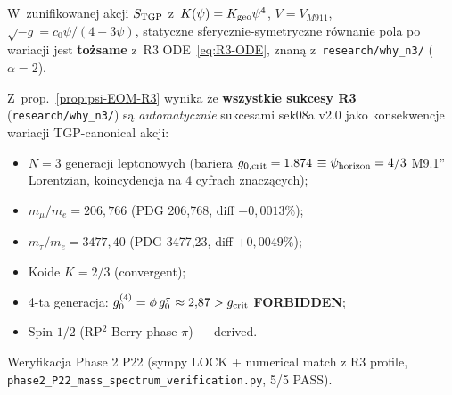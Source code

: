 \begin{proposition}%
\label{prop:psi-EOM-R3}
W~zunifikowanej akcji $S_{\rm TGP}$ z~$K(\psi) = K_{\rm geo}\psi^4$,
$V = V_{M911}$, $\sqrt{-g} = c_0\psi/(4-3\psi)$, statyczne sferycznie-symetryczne
r\'ownanie pola po wariacji jest \textbf{to\.zsame} z~R3 ODE~\eqref{eq:R3-ODE},
znan\k{a} z~\texttt{research/why\_n3/} ($\alpha = 2$).
\end{proposition}

\begin{remark}%
\label{rem:psi-EOM-R3-consequences}
Z~prop.~\ref{prop:psi-EOM-R3} wynika \.ze \textbf{wszystkie sukcesy R3}
(\texttt{research/why\_n3/}) s\k{a} \emph{automatycznie} sukcesami
sek08a v2.0 jako konsekwencje wariacji TGP-canonical akcji:
\begin{itemize}[nosep]
  \item $N = 3$ generacji leptonowych (bariera $g_{0,\rm crit} = 1{,}874$
    $\equiv \psi_{\rm horizon} = 4/3$ M9.1'' Lorentzian, koincydencja na
    4 cyfrach znacz\k{a}cych);
  \item $m_\mu/m_e = 206{,}766$ (PDG 206{,}768, diff $-0{,}0013\%$);
  \item $m_\tau/m_e = 3477{,}40$ (PDG 3477{,}23, diff $+0{,}0049\%$);
  \item Koide $K = 2/3$ (convergent);
  \item 4-ta generacja: $g_0^{(4)} = \phi\,g_0^\tau \approx 2{,}87 > g_{\rm crit}$
    \textbf{FORBIDDEN};
  \item Spin-$1/2$ (RP$^2$ Berry phase $\pi$) --- derived.
\end{itemize}
Wery\-fika\-cja Phase 2 P22 (sympy LOCK + numerical match z R3 profile,
\texttt{phase2\_P22\_mass\_spectrum\_verification.py}, 5/5 PASS).
\end{remark}

